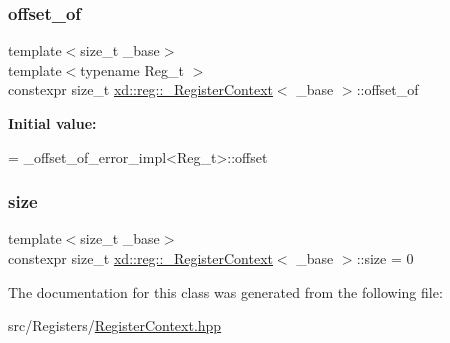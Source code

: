 \mbox{\label{classxd_1_1reg_1_1___register_context_3_01__base_01_4_ac4c294c21addd3adee80dcb3578293f8}} 
\subsubsection{\texorpdfstring{offset\+\_\+of}{offset\_of}}
{\footnotesize\ttfamily template$<$size\+\_\+t \+\_\+base$>$ \\
template$<$typename Reg\+\_\+t $>$ \\
constexpr size\+\_\+t \mbox{\hyperlink{classxd_1_1reg_1_1___register_context}{xd\+::reg\+::\+\_\+\+Register\+Context}}$<$ \+\_\+base $>$\+::offset\+\_\+of\hspace{0.3cm}{\ttfamily [static]}}

{\bfseries Initial value\+:}
\begin{DoxyCode}
=
      \_offset\_of\_error\_impl<Reg\_t>::offset
\end{DoxyCode}
\mbox{\label{classxd_1_1reg_1_1___register_context_3_01__base_01_4_a1285022e856efc8336983f6b86019590}} 
\subsubsection{\texorpdfstring{size}{size}}
{\footnotesize\ttfamily template$<$size\+\_\+t \+\_\+base$>$ \\
constexpr size\+\_\+t \mbox{\hyperlink{classxd_1_1reg_1_1___register_context}{xd\+::reg\+::\+\_\+\+Register\+Context}}$<$ \+\_\+base $>$\+::size = 0\hspace{0.3cm}{\ttfamily [static]}}



The documentation for this class was generated from the following file\+:\begin{DoxyCompactItemize}
\item 
src/\+Registers/\mbox{\hyperlink{_register_context_8hpp}{Register\+Context.\+hpp}}\end{DoxyCompactItemize}
